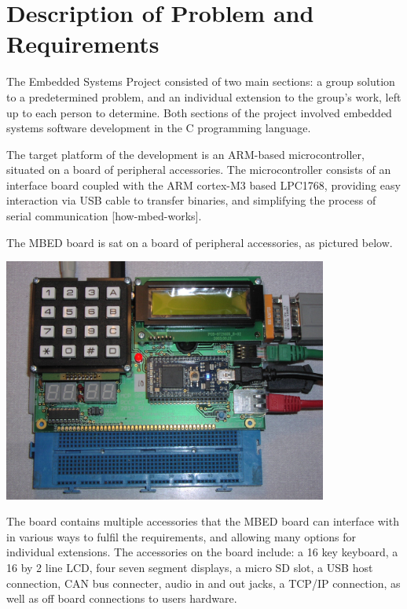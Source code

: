 \section{Description of Problem and Requirements}
The Embedded Systems Project consisted of two main sections: a group solution 
to a predetermined problem, and an individual extension to the group's work, 
left up to each person to determine. Both sections of the project involved 
embedded systems software development in the C programming language. 
\par\bigskip\noindent
The target platform of the development is an ARM-based microcontroller, 
situated on a board of peripheral accessories. The microcontroller consists of 
an interface board coupled with the ARM cortex-M3 based LPC1768, providing easy 
interaction via USB cable to transfer binaries, and simplifying the process of 
serial communication [how-mbed-works].
\par\bigskip\noindent
The MBED board is sat on a board of peripheral accessories, as pictured below. 
\par\bigskip
\includegraphics[width=0.80\textwidth]{./mbed_board}
\par\bigskip\noindent
The board contains multiple accessories that the MBED board can interface with 
in various ways to fulfil the requirements, and allowing many options for 
individual extensions. The accessories on the board include: a 16 key keyboard, 
a 16 by 2 line LCD, four seven segment displays, a micro SD slot, a USB host 
connection, CAN bus connecter, audio in and out jacks, a TCP/IP connection, as 
well as off board connections to users hardware. 

